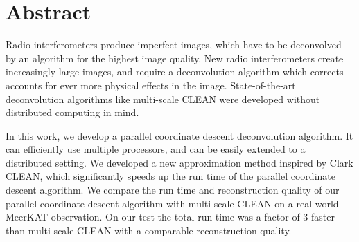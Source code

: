 \section*{Abstract}
Radio interferometers produce imperfect images, which have to be deconvolved by an algorithm for the highest image quality. New radio interferometers create increasingly large images, and require a deconvolution algorithm which corrects accounts for ever more physical effects in the image. State-of-the-art deconvolution algorithms like multi-scale CLEAN were developed without distributed computing in mind.

In this work, we develop a parallel coordinate descent deconvolution algorithm. It can efficiently use multiple processors, and can be easily extended to a distributed setting. We developed a new approximation method inspired by Clark CLEAN, which significantly speeds up the run time of the parallel coordinate descent algorithm. We compare the run time and reconstruction quality of our parallel coordinate descent algorithm with multi-scale CLEAN on a real-world MeerKAT observation. On our test the total run time was a factor of 3 faster than multi-scale CLEAN with a comparable reconstruction quality.




